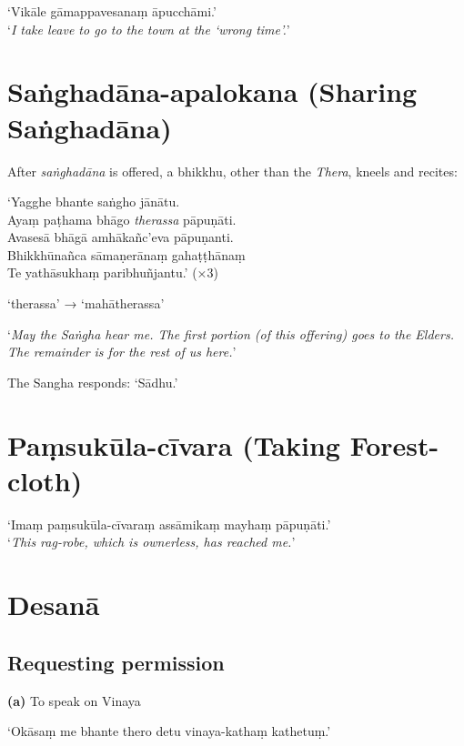 ‘Vikāle gāmappavesanaṃ āpucchāmi.’\\
‘\emph{I take leave to go to the town at the ‘wrong time’.}’ 

\section{Saṅghadāna-apalokana (Sharing Saṅghadāna)}

After \emph{saṅghadāna} is offered, a bhikkhu, other than the \emph{Thera},
kneels and recites:

‘Yagghe bhante saṅgho jānātu.\\
Ayaṃ paṭhama bhāgo \emph{therassa} pāpuṇāti.\\
Avasesā bhāgā amhākañc’eva pāpuṇanti.\\
Bhikkhūnañca sāmaṇerānaṃ gahaṭṭhānaṃ\\
Te yathāsukhaṃ paribhuñjantu.’ (×3)

‘therassa’ → ‘mahātherassa’


‘\emph{May the Saṅgha hear me. The first portion (of this offering) goes to the
  Elders. The remainder is for the rest of us here.}’

The Sangha responds: ‘Sādhu.’ 

\section{Paṃsukūla-cīvara (Taking Forest-cloth)}

‘Imaṃ paṃsukūla-cīvaraṃ assāmikaṃ mayhaṃ pāpuṇāti.’\\
‘\emph{This rag-robe, which is ownerless, has reached me.}’

\section{Desanā}

\subsection{Requesting permission}

\textbf{(a)} To speak on Vinaya


‘Okāsaṃ me bhante thero detu vinaya-kathaṃ kathetuṃ.’

